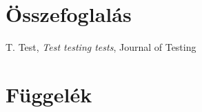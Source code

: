\documentclass[12pt, twosides]{report}
\begin{document}
\chapter{Összefoglalás}


\begin{thebibliography}{99}
 T. Test, \emph{Test testing tests}, Journal of Testing
%
%
\end{thebibliography}

\appendix
\chapter{Függelék}

\end{document}
